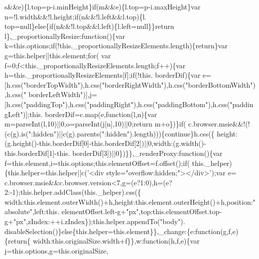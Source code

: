 \begin{DoxyCode}
      s&&e)\{l.top=p-i.minHeight\}\textcolor{keywordflow}{if}(m&&e)\{l.top=p-i.maxHeight\}var n=!l.width&&!l.height;\textcolor{keywordflow}{if}(n&&!l.left&&l.top)\{l.
      top=null\}\textcolor{keywordflow}{else}\{\textcolor{keywordflow}{if}(n&&!l.top&&l.left)\{l.left=null\}\}\textcolor{keywordflow}{return} l\},\_proportionallyResize:\textcolor{keyword}{function}()\{var 
      k=this.options;\textcolor{keywordflow}{if}(!this.\_proportionallyResizeElements.length)\{\textcolor{keywordflow}{return}\}var g=this.helper||this.element;\textcolor{keywordflow}{for}(
      var f=0;f<this.\_proportionallyResizeElements.length;f++)\{var h=this.\_proportionallyResizeElements[f];\textcolor{keywordflow}{if}(!this.
      borderDif)\{var e=[h.css(\textcolor{stringliteral}{"borderTopWidth"}),h.css(\textcolor{stringliteral}{"borderRightWidth"}),h.css(\textcolor{stringliteral}{"borderBottomWidth"}),h.css(\textcolor{stringliteral}{"
      borderLeftWidth"})],j=[h.css(\textcolor{stringliteral}{"paddingTop"}),h.css(\textcolor{stringliteral}{"paddingRight"}),h.css(\textcolor{stringliteral}{"paddingBottom"}),h.css(\textcolor{stringliteral}{"paddingLeft"})];this.
      borderDif=c.map(e,\textcolor{keyword}{function}(l,n)\{var m=parseInt(l,10)||0,o=parseInt(j[n],10)||0;\textcolor{keywordflow}{return} m+o\})\}\textcolor{keywordflow}{if}(
      c.browser.msie&&!(!(c(g).is(\textcolor{stringliteral}{":hidden"})||c(g).parents(\textcolor{stringliteral}{":hidden"}).length)))\{\textcolor{keywordflow}{continue}\}h.css(\{
      height:(g.height()-this.borderDif[0]-this.borderDif[2])||0,width:(g.width()-this.borderDif[1]-this.
      borderDif[3])||0\})\}\},\_renderProxy:\textcolor{keyword}{function}()\{var f=this.element,i=this.options;this.elementOffset=f.offset();\textcolor{keywordflow}{if}(
      this.\_helper)\{this.helper=this.helper||c(\textcolor{stringliteral}{'<div style="overflow:hidden;"></div>'});var e=
      c.browser.msie&&c.browser.version<7,g=(e?1:0),h=(e?2:-1);this.helper.addClass(this.\_helper).css(\{
      width:this.element.outerWidth()+h,height:this.element.outerHeight()+h,position:\textcolor{stringliteral}{"absolute"},left:this.
      elementOffset.left-g+\textcolor{stringliteral}{"px"},top:this.elementOffset.top-g+\textcolor{stringliteral}{"px"},zIndex:++i.zIndex\});this.helper.appendTo(\textcolor{stringliteral}{"body"}).
      disableSelection()\}\textcolor{keywordflow}{else}\{this.helper=this.element\}\},\_change:\{e:\textcolor{keyword}{function}(g,f,e)\{\textcolor{keywordflow}{return}\{
      width:this.originalSize.width+f\}\},w:\textcolor{keyword}{function}(h,f,e)\{var j=this.options,g=this.originalSize,

\end{DoxyCode}
